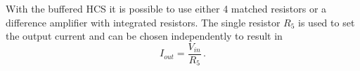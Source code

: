 With the buffered HCS it is possible to use either \num{4} matched resistors or a difference amplifier with integrated resistors. The single resistor $R_5$ is used to set the output current and can be chosen independently to result in
\begin{equation}
    I_{out} = \frac{V_{in}}{R_5}\,.
\end{equation}

